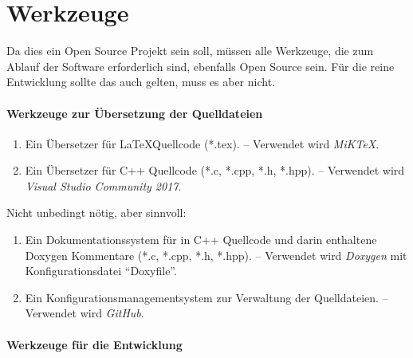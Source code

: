 \section{Werkzeuge}%
\label{sec:Werkzeuge}

Da dies ein Open Source Projekt sein soll, müssen alle Werkzeuge, die zum Ablauf der Software erforderlich sind, ebenfalls Open Source sein.
Für die reine Entwicklung sollte das auch gelten, muss es aber nicht.

\paragraph{Werkzeuge zur Übersetzung der Quelldateien}%

\begin{enumerate}

	\item\label{Werkzeug:LaTeX}
	Ein Übersetzer für \LaTeX Quellcode (*.tex).
	-- Verwendet wird \emph{MiK\TeX}.

	\item\label{Werkzeug:C++}
	Ein Übersetzer für C++ Quellcode (*.c, *.cpp, *.h, *.hpp).
	-- Verwendet wird \emph{Visual Studio Community 2017}.

	\setcounter{Enumi}{\value{enumi}}%
\end{enumerate}
%
Nicht unbedingt nötig, aber sinnvoll:
\begin{enumerate}
	\setcounter{enumi}{\value{Enumi}}%

	\item\label{Werkzeug:Dokumentation}
	Ein Dokumentationssystem für in C++ Quellcode und darin enthaltene Doxygen Kommentare (*.c, *.cpp, *.h, *.hpp).
	-- Verwendet wird \emph{Doxygen} mit Konfigurationsdatei \enquote{Doxyfile}.

	\item\label{Werkzeug:Konfigurationsmanagement}
	Ein Konfigurationsmanagementsystem zur Verwaltung der Quelldateien.
	-- Verwendet wird \emph{GitHub}.

	\setcounter{Enumi}{\value{enumi}}%
\end{enumerate}

\paragraph{Werkzeuge für die Entwicklung}%

